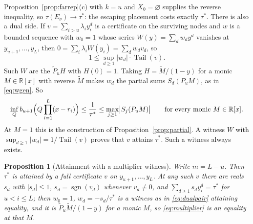 \documentclass[11pt]{article}
\newtheorem{proposition}[theorem]{Proposition}
\theoremstyle{definition}
\theoremstyle{plain}
\newcommand{\R}{\mathbb R}
\DeclareMathOperator{\Tail}{Tail}
\DeclareMathOperator{\sgn}{sgn}
\begin{document}
Proposition~\ref{prop:farrep}(c) with $k=u$ and $X_0=\varnothing$ supplies the
reverse inequality, so $\tau(E_\nu)\to\tau^*$:
the escaping placement costs exactly $\tau^*$.  There is also a dual side.  If
$v=\sum_{i>u}\lambda_iy_i^d$ is a certificate on the surviving nodes and $w$
is a bounded sequence with $w_0=1$ whose series $W(y)=\sum_dw_dy^d$ vanishes
at $y_{u+1},\ldots,y_L$, then $0=\sum_i\lambda_iW(y_i)=\sum_dw_dv_d$, so
\begin{equation}\label{eq:dualpair}
  1\le\sup_{d\ge1}|w_d|\cdot\Tail(v).
\end{equation}
Such $W$ are the $\widetilde P_uH$ with $H(0)=1$.  Taking
$H=\widetilde M/(1-y)$ for a monic $M\in\R[x]$ with reverse $\widetilde M$
makes $w_d$ the partial sums $S_d(P_uM)$, as in \eqref{eq:wgen}.  So
\begin{equation}\label{eq:multiplier}
  \inf_Qb_{u+1}\Bigl(Q\prod_{i=1}^L(x-r_i)\Bigr)\le\frac1{\tau^*}
  \le\max_{j\ge1}\bigl|S_j(P_uM)\bigr|
  \qquad\text{for every monic }M\in\R[x].
\end{equation}
At $M=1$ this is the construction of Proposition~\ref{prop:partial}.  A
witness $W$ with $\sup_{d\ge1}|w_d|=1/\Tail(v)$ proves that $v$ attains
$\tau^*$.  Such a witness always exists.

\begin{proposition}[Attainment with a multiplier witness]\label{prop:attain}
Write $m=L-u$.  Then $\tau^*$ is attained by a full certificate $v$ on
$y_{u+1},\ldots,y_L$.  At any such $v$ there are reals $s_d$ with
$|s_d|\le1$, $s_d=\sgn(v_d)$ whenever $v_d\ne0$, and
$\sum_{d\ge1}s_dy_i^d=\tau^*$ for $u<i\le L$; then $w_0=1$,
$w_d=-s_d/\tau^*$ is a witness as in \eqref{eq:dualpair} attaining equality,
and it is $\widetilde P_u\widetilde M/(1-y)$ for a monic $M$, so
\eqref{eq:multiplier} is an equality at that $M$.
\end{proposition}
\end{document}
